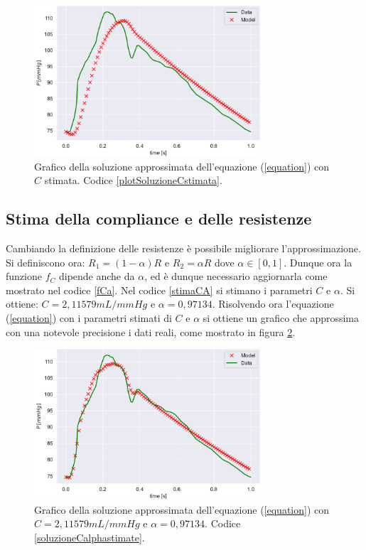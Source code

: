 \begin{figure}[h]
    \centering
    \includegraphics[width=0.75\textwidth]{images/Windkessel/modelloCstimata.pdf}
    \caption{Grafico della soluzione approssimata dell'equazione (\ref{equation}) con $C$ stimata. Codice \ref{plotSoluzioneCstimata}.}
    \label{soluzioneCapprossimata}
\end{figure}


\subsection{Stima della compliance e delle resistenze}\label{stimaCR}
Cambiando la definizione delle resistenze è possibile migliorare l'approssimazione. Si definiscono ora: $R_1=(1-\alpha)R$ e $R_2=\alpha R$ dove $\alpha\in[0,1]$. Dunque ora la funzione $f_C$ dipende anche da $\alpha$, ed è dunque necessario aggiornarla come mostrato nel codice \ref{fCa}.
Nel codice \ref{stimaCA} si stimano i parametri $C$ e $\alpha$. Si ottiene: $C=2,11579 mL/mmHg$ e $\alpha=0,97134$.
Risolvendo ora l'equazione (\ref{equation}) con i parametri stimati di $C$ e $\alpha$ si ottiene un grafico che approssima con una notevole precisione i dati reali, come mostrato in figura \ref{soluzioneCalphaapprossimata}.

\begin{figure}[h]
    \centering
    \includegraphics[width=0.75\textwidth]{images/Windkessel/modelloCalphastimata.pdf}
    \caption{Grafico della soluzione approssimata dell'equazione (\ref{equation}) con $C=2,11579mL/mmHg$ e $\alpha=0,97134$. Codice \ref{soluzioneCalphastimate}.}
    \label{soluzioneCalphaapprossimata}
\end{figure}


